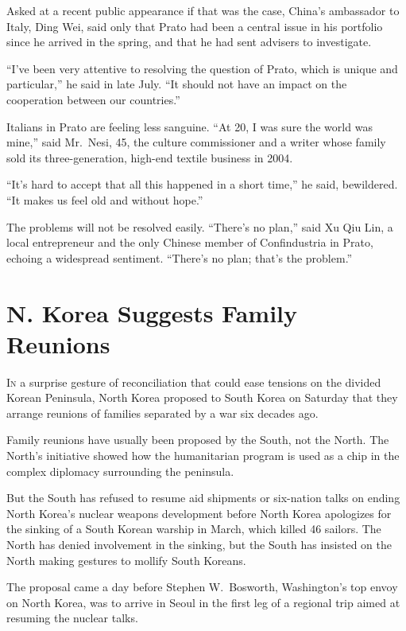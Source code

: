 ﻿\documentclass[12pt]{article}
\begin{document}
Asked at a recent public appearance if that was the case, China's ambassador to Italy, Ding Wei,
said only that Prato had been a central issue in his portfolio since he arrived in the spring, and
that he had sent advisers to investigate.

``I've been very attentive to resolving the question of Prato, which is unique and particular,'' he
said in late July. ``It should not have an impact on the cooperation between our countries.''

Italians in Prato are feeling less sanguine. ``At 20, I was sure the world was mine,'' said
Mr.~Nesi, 45, the culture commissioner and a writer whose family sold its three-generation, high-end
textile business in 2004.

``It's hard to accept that all this happened in a short time,'' he said, bewildered. ``It makes us
feel old and without hope.''

The problems will not be resolved easily. ``There's no plan,'' said Xu Qiu Lin, a local entrepreneur
and the only Chinese member of Confindustria in Prato, echoing a widespread sentiment. ``There's no
plan; that's the problem.''

\pagebreak
\section{N. Korea Suggests Family Reunions}

\lettrine{I}{n} a surprise gesture of reconciliation that could ease
tensions on the divided Korean Peninsula, North Korea proposed to South Korea on Saturday that they
arrange reunions of families separated by a war six decades ago.

Family reunions have usually been proposed by the South, not the North. The North's initiative
showed how the humanitarian program is used as a chip in the complex diplomacy surrounding the
peninsula.

But the South has refused to resume aid shipments or six-nation talks on ending North Korea's
nuclear weapons development before North Korea apologizes for the sinking of a South Korean warship
in March, which killed 46 sailors. The North has denied involvement in the sinking, but the South
has insisted on the North making gestures to mollify South Koreans.

The proposal came a day before Stephen W.~Bosworth, Washington's top envoy on North Korea, was to
arrive in Seoul in the first leg of a regional trip aimed at resuming the nuclear talks.
\end{document}
